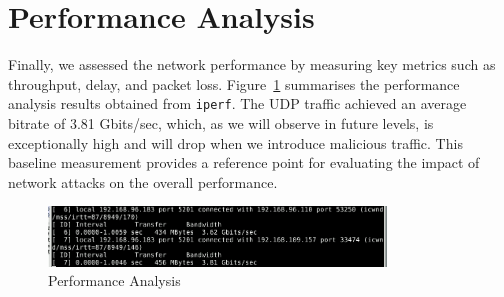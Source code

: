 \section{Performance Analysis}

Finally, we assessed the network performance by measuring key metrics such as throughput, delay, and packet loss. Figure~\ref{fig:level2PerformanceAnalysis} summarises the performance analysis results obtained from \texttt{iperf}. The UDP traffic achieved an average bitrate of 3.81 Gbits/sec, which, as we will observe in future levels, is exceptionally high and will drop when we introduce malicious traffic. This baseline measurement provides a reference point for evaluating the impact of network attacks on the overall performance.

\begin{figure}[H]
\centering
\includegraphics[width=0.8\textwidth]{img/level2/level2-server-performance-analysis.png}
\caption{Performance Analysis}\label{fig:level2PerformanceAnalysis}
\end{figure}